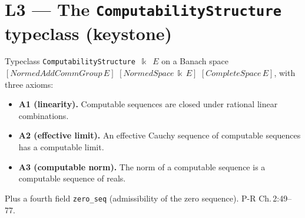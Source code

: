 \chapter{L3 — The \texttt{ComputabilityStructure} typeclass (keystone)}


\begin{definition}
  \label{def:l3_computabilityStructure}
  \leanok
  Typeclass \texttt{ComputabilityStructure}~$\Bbbk$~$E$ on a Banach space $[NormedAddCommGroup\,E]$ $[NormedSpace\,\Bbbk\,E]$ $[CompleteSpace\,E]$, with three axioms:
  \begin{itemize}
    \item \textbf{A1 (linearity).} Computable sequences are closed under rational linear combinations.
    \item \textbf{A2 (effective limit).} An effective Cauchy sequence of computable sequences has a computable limit.
    \item \textbf{A3 (computable norm).} The norm of a computable sequence is a computable sequence of reals.
  \end{itemize}
  Plus a fourth field \texttt{zero\_seq} (admissibility of the zero sequence). P-R Ch.\,2:49--77.
\end{definition}
